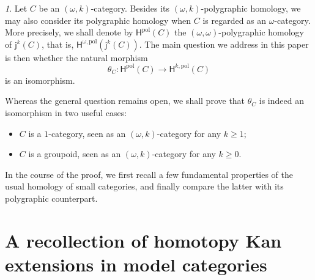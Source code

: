 \documentclass[reqno]{amsart}
\theoremstyle{plain}
\theoremstyle{definition}
\theoremstyle{remark}
\newtheorem{paragr}[subsubsection]{} %
\newcommand{\pair}[2]{(#1,#2)}       %
\newcommand{\functor}[1]{\mathsf{#1}} %
\newcommand{\emb}[2]{\functor{j}_{#2}^{#1}}%
\newcommand{\oemb}[1]{\emb{#1}{}}%
\newcommand{\homnat}{\theta}%
\newcommand{\oo}{\ensuremath{\omega}}
\newcommand{\ook}[1]{\ensuremath{\pair{\omega}{#1}}}
\newcommand{\Ho}{\functor{H}} %
\newcommand{\Hop}[1]{\Ho^{#1,\mathrm{pol}}} %
\newcommand{\Hopol}{\Ho^{\mathrm{pol}}}%
\begin{document}
\begin{paragr}\label{paragr:mainquestion}
  Let $C$ be an \ook k-category. Besides its \ook k-polygraphic
  homology, we may also consider its polygraphic homology when $C$ is regarded
  as an \oo-category. More precisely, we shall denote by $\Hopol(C)$ the
  \ook{\oo}-polygraphic homology of $\oemb{k}(C)$, that is,
  $\Hop{\oo}(\oemb{k}(C))$. The main question we address in this paper
  is then whether the natural morphism
  \[\homnat_C\colon \Hopol(C)\to \Hop{k}(C)  \]
  is an isomorphism.

  Whereas the general question remains open,
  we shall prove that $\homnat_C$ is indeed an isomorphism in two
  useful cases:
  \begin{itemize}
  \item $C$ is a $1$-category, seen as an \ook k-category for any $k\geq
    1$;
  \item $C$ is a groupoid, seen as an \ook k-category for any $k\geq
    0$.
  \end{itemize}
  In the course of the proof, we first recall a few fundamental
  properties of the usual homology of small categories, and finally
  compare the latter with its polygraphic counterpart.
\end{paragr}
\section{A recollection of homotopy Kan extensions in model categories}\label{sec:htpykan}
\end{document}
